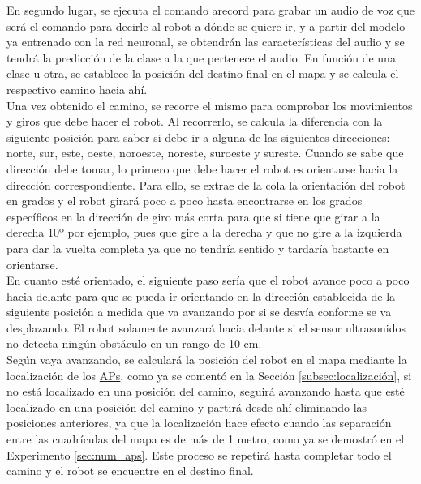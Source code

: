 En segundo lugar, se ejecuta el comando arecord para grabar un audio de voz que será el comando para decirle al robot a dónde se quiere ir, y a partir del modelo ya entrenado con la red neuronal, se obtendrán las características del audio y se tendrá la predicción de la clase a la que pertenece el audio. En función de una clase u otra, se establece la posición del destino final en el mapa y se calcula el respectivo camino hacia ahí.\\

Una vez obtenido el camino, se recorre el mismo para comprobar los movimientos y giros que debe hacer el robot. Al recorrerlo, se calcula la diferencia con la siguiente posición para saber si debe ir a alguna de las siguientes direcciones: norte, sur, este, oeste, noroeste, noreste, suroeste y sureste. Cuando se sabe que dirección debe tomar, lo primero que debe hacer el robot es orientarse hacia la dirección correspondiente. Para ello, se extrae de la cola la orientación del robot en grados y el robot girará poco a poco hasta encontrarse en los grados específicos en la dirección de giro más corta para que si tiene que girar a la derecha 10º por ejemplo, pues que gire a la derecha y que no gire a la izquierda para dar la vuelta completa ya que no tendría sentido y tardaría bastante en orientarse.\\

En cuanto esté orientado, el siguiente paso sería que el robot avance poco a poco hacia delante para que se pueda ir orientando en la dirección establecida de la siguiente posición a medida que va avanzando por si se desvía conforme se va desplazando. El robot solamente avanzará hacia delante si el sensor ultrasonidos no detecta ningún obstáculo en un rango de 10 cm.\\

Según vaya avanzando, se calculará la posición del robot en el mapa mediante la localización de los \hyperlink{APs}{APs}, como ya se comentó en la Sección \ref{subsec:localización}, si no está localizado en una posición del camino, seguirá avanzando hasta que esté localizado en una posición del camino y partirá desde ahí eliminando las posiciones anteriores, ya que la localización hace efecto cuando las separación entre las cuadrículas del mapa es de más de 1 metro, como ya se demostró en el Experimento \ref{sec:num_aps}. Este proceso se repetirá hasta completar todo el camino y el robot se encuentre en el destino final.




